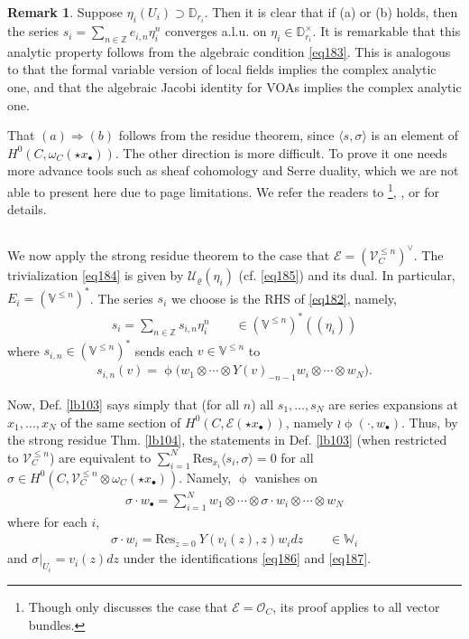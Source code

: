 \documentclass[11pt,b5paper,notitlepage]{article}
\theoremstyle{definition}
\newtheorem{rem}[df]{Remark}
\theoremstyle{plain}
\newcommand{\mc}{\mathcal}
\newcommand{\Res}{\mathrm{Res}}
\newcommand{\bk}[1]{\langle {#1}\rangle}
\newcommand{\scr}{\mathscr}
\newcommand{\blt}{\bullet}
\newcommand{\Vbb}{\mathbb V}
\newcommand{\Wbb}{\mathbb W}
\newcommand{\Zbb}{\mathbb Z}
\newcommand{\Dbb}{\mathbb D}
\numberwithin{equation}{section}
\begin{document}
\begin{rem}
Suppose $\eta_i(U_i)\supset\Dbb_{r_i}$. Then it is clear that if (a) or (b) holds, then the series $s_i=\sum_{n\in\Zbb} e_{i,n}\eta_i^n$ converges a.l.u. on $\eta_i\in\Dbb_{r_i}^\times$.  It is remarkable that this analytic property follows from the algebraic condition \eqref{eq183}. This is analogous to that the formal variable version of local fields implies the complex analytic one, and that the algebraic Jacobi identity for VOAs implies the complex analytic one.
\end{rem}

That $(a)\Rightarrow(b)$ follows from the residue theorem, since $\bk{s,\sigma}$ is an element of $H^0(C,\omega_C(\star x_\blt))$. The other direction is more difficult. To prove it one needs more advance tools  such as sheaf cohomology and Serre duality, which we are not able to present here due to page limitations. We refer the readers to \cite[Sec. 1.2.2]{Muk10}\footnote{Though \cite{Muk10} only discusses the case that $\scr E=\scr O_C$, its proof applies to all vector bundles.}, \cite[Sec. 1.4]{Gui}, or \cite[Sec. 7]{Gui21} for details.



\subsection{}


We now apply the strong residue theorem to the case that $\scr E=(\scr V_C^{\leq n})^\vee$. The trivialization \eqref{eq184} is given by $\mc U_\varrho(\eta_i)$ (cf. \eqref{eq185}) and its dual. In particular, $E_i=(\Vbb^{\leq n})^*$. The series $s_i$  we choose is the RHS of \eqref{eq182}, namely,
\begin{align*}
s_i=\sum_{n\in\Zbb}s_{i,n}\eta_i^n\qquad \in (\Vbb^{\leq n})^*((\eta_i))
\end{align*}
where $s_{i,n}\in (\Vbb^{\leq n})^*$ sends each $v\in\Vbb^{\leq n}$ to
\begin{align*}
s_{i,n}(v)=\upphi\big(w_1\otimes\cdots\otimes Y(v)_{-n-1}w_i\otimes\cdots\otimes w_N\big).
\end{align*}


Now, Def. \ref{lb103} says simply that (for all $n$) all $s_1,\dots,s_N$ are series expansions at $x_1,\dots,x_N$ of the same section of $H^0(C,\scr E(\star x_\blt))$, namely $\wr\upphi(\cdot,w_\blt)$. Thus, by the strong residue Thm. \ref{lb104}, the statements in Def. \ref{lb103} (when restricted to $\scr V^{\leq n}_C$) are equivalent to $\sum_{i=1}^N \Res_{x_i}\bk{s_i,\sigma}=0$ for all $\sigma\in H^0(C,\scr V_C^{\leq n}\otimes\omega_C(\star x_\blt))$. Namely, $\upphi$ vanishes on
\begin{align}
\sigma\cdot w_\blt=\sum_{i=1}^N w_1\otimes\cdots \otimes \sigma\cdot w_i\otimes\cdots\otimes w_N\label{eq188}
\end{align}
where for each $i$,
\begin{gather}
\sigma\cdot w_i=\Res_{z=0} ~Y(v_i(z),z)w_idz \qquad\in\Wbb_i\label{eq190}
\end{gather}
and $\sigma|_{U_i}=v_i(z)dz$ under the identifications \eqref{eq186} and \eqref{eq187}. 
\end{document}
